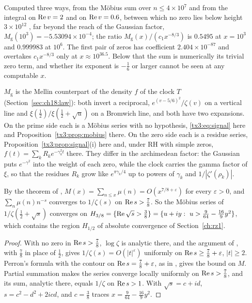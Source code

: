 Computed three ways, from the M\"obius sum over $n\le4\times10^7$ and from the integral on $\operatorname{Re} v=2$ and on $\operatorname{Re} v=0.6$, between which no zero lies below height $3\times10^{12}$ \cite{PT21}, far beyond the reach of the Gaussian factor, $M_{\mathrm g}(10^3)=-5.53094\times10^{-4}$; the ratio $M_{\mathrm g}(x)/(c_1x^{-8/3})$ is $0.5495$ at $x=10^3$ and $0.999983$ at $10^6$. The first pair of zeros has coefficient $2.404\times10^{-87}$ and overtakes $c_1x^{-8/3}$ only at $x\approx10^{36.5}$. Below that the sum is numerically its trivial zero term, and whether its exponent is $-\frac16$ or larger cannot be seen at any computable $x$.

$M_{\mathrm g}$ is the Mellin counterpart of the density $f$ of the clock $T$ (Section~\ref{sec:ch18:law}): both invert a reciprocal, $e^{(v-5/6)^2}/\zeta(v)$ on a vertical line and $\xi(\frac12)/\xi(\frac12+\sqrt u)$ on a Bromwich line, and both have two expansions. On the prime side each is a M\"obius series with no hypothesis, \eqref{tx3:eq:signal} here and Proposition~\ref{tx3:prop:mobius} there. On the zero side each is a residue series, Proposition~\ref{tx3:prop:signal}(i) here and, under RH with simple zeros, $f(t)=\sum_kR_ke^{-\gamma_k^2t}$ there. They differ in the archimedean factor: the Gaussian puts $e^{-\gamma^2}$ into the weight of each zero, while the clock carries the gamma factor of $\xi$, so that the residues $R_k$ grow like $e^{\pi\gamma_k/4}$ up to powers of $\gamma_k$ and $1/|\zeta'(\rho_k)|$.

\begin{proposition}\label{tx5:prop:mertens}
By the theorem of \cite{OAI26a}, $M(x)=\sum_{n\le x}\mu(n)=O(x^{7/8+\varepsilon})$ for every $\varepsilon>0$, and $\sum_n\mu(n)n^{-s}$ converges to $1/\zeta(s)$ on $\operatorname{Re} s>\frac78$. So the M\"obius series of $1/\zeta(\frac12+\sqrt s)$ converges on $H_{3/8}=\{\operatorname{Re}\sqrt s>\frac38\}=\{u+iy:\ u>\frac9{64}-\frac{16}9y^2\}$, which contains the region $H_{1/2}$ of absolute convergence of Section~\ref{ch:rz1}.
\end{proposition}

\begin{proof}
With no zero in $\operatorname{Re} s>\frac78$, $\log\zeta$ is analytic there, and the argument of \cite[Section~14.2]{Titchmarsh}, with $\frac78$ in place of $\frac12$, gives $1/\zeta(s)=O(|t|^\varepsilon)$ uniformly on $\operatorname{Re} s\ge\frac78+\varepsilon$, $|t|\ge2$. Perron's formula with the contour on $\operatorname{Re} s=\frac78+\varepsilon$, as in \cite[Section~14.25]{Titchmarsh}, gives the bound on $M$. Partial summation makes the series converge locally uniformly on $\operatorname{Re} s>\frac78$, and its sum, analytic there, equals $1/\zeta$ on $\operatorname{Re} s>1$. With $\sqrt s=c+id$, $s=c^2-d^2+2icd$, and $c=\frac38$ traces $x=\frac9{64}-\frac{16}9y^2$.
\end{proof}

